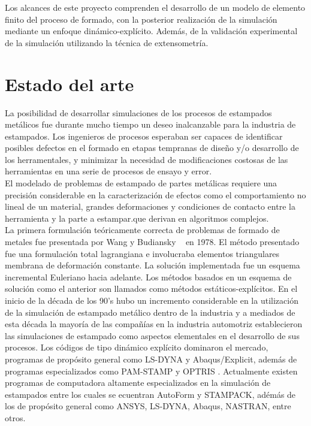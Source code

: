 Los alcances de este proyecto comprenden el desarrollo de un modelo de elemento finito del proceso de 
formado, con la posterior realización de la simulación mediante un enfoque dinámico-explícito. Además, 
de la validación experimental de la simulación utilizando la técnica de extensometría.



\section{Estado del arte}

La posibilidad de desarrollar simulaciones de los procesos de estampados metálicos fue durante mucho tiempo 
un deseo inalcanzable para la industria de estampados. Los ingenieros de procesos esperaban ser capaces de 
identificar posibles defectos en el formado en etapas tempranas de diseño y/o desarrollo de los herramentales, 
y minimizar la necesidad de modificaciones costosas de las herramientas en una serie de procesos de ensayo y error. \\

El modelado de problemas de estampado de partes metálicas requiere una precisión considerable en la caracterización 
de efectos como el comportamiento no lineal de un material, grandes deformaciones y condiciones de contacto entre la
herramienta y la parte a estampar.que derivan  en algoritmos complejos.\cite{banabic2000}\\

La primera formulación teóricamente correcta de problemas de formado de metales fue presentada por 
Wang y Budiansky ~\cite{wang1978} en 1978. El método presentado fue una formulación total lagrangiana 
e involucraba elementos triangulares membrana de deformación constante. La solución implementada fue 
un esquema incremental Euleriano hacia adelante. Los métodos basados en un 
esquema de solución como el anterior son llamados como métodos estáticos-explícitos.
En el inicio de la década de los 90's hubo un incremento considerable en la utilización de la simulación de estampado 
metálico dentro de la industria y a mediados de esta década la mayoría de las compañías en la industria automotriz 
establecieron las simulaciones de estampado como aspectos elementales en el desarrollo de sus procesos.
Los códigos de tipo dinámico explícito dominaron el mercado, programas de propósito general como LS-DYNA y 
Abaqus/Explicit, además de programas especializados como PAM-STAMP y OPTRIS \cite{banabic2000}.
Actualmente existen programas de computadora altamente especializados en la simulación de estampados entre los 
cuales se ecuentran AutoForm y STAMPACK, adémás de los de propósito general como ANSYS, LS-DYNA, Abaqus, 
NASTRAN, entre otros.\\

